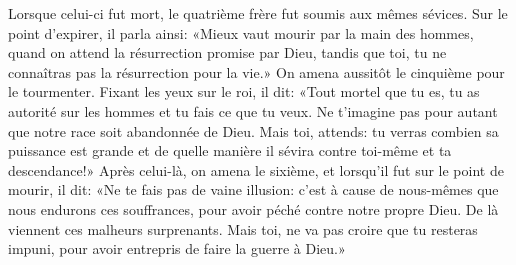 Lorsque celui-ci fut mort, le quatrième frère fut soumis aux mêmes sévices.
Sur le point d’expirer, il parla ainsi:
	«Mieux vaut mourir par la main des hommes,
		quand on attend la résurrection promise par Dieu,
	tandis que toi, tu ne connaîtras pas la résurrection pour la vie.»
On amena aussitôt le cinquième pour le tourmenter.
Fixant les yeux sur le roi, il dit:
	«Tout mortel que tu es, tu as autorité sur les hommes et tu fais ce que tu veux.
	Ne t’imagine pas pour autant que notre race soit abandonnée de Dieu.
Mais toi, attends: tu verras combien sa puissance est grande
	et de quelle manière il sévira contre toi-même et ta descendance!»
Après celui-là, on amena le sixième, et lorsqu’il fut sur le point de mourir, il dit:
	«Ne te fais pas de vaine illusion:
	c’est à cause de nous-mêmes que nous endurons ces souffrances,
	pour avoir péché contre notre propre Dieu.
	De là viennent ces malheurs surprenants.
Mais toi, ne va pas croire que tu resteras impuni,
	pour avoir entrepris de faire la guerre à Dieu.»
